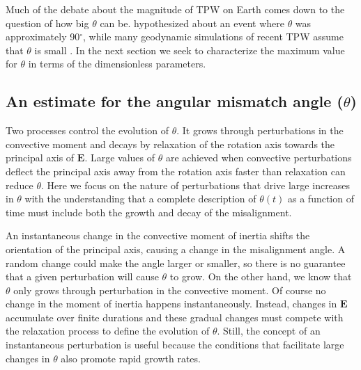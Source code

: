 \documentclass[preprint,12pt,authoryear]{elsarticle}
\begin{document}
 Much of the debate about the magnitude of TPW on Earth comes down to the question of how big $\theta$ can be. \citet{kirschvink1997evidence} hypothesized about an event where $\theta$ was approximately 90$^\circ$, while many geodynamic simulations of recent TPW assume that $\theta$ is small \citep{steinberger1997changes}. In the next section we seek to characterize the maximum value for $\theta$ in terms of the dimensionless parameters.

\subsection{An estimate for the angular mismatch angle ($\theta$)}
\label{sec:theta}

Two processes control the evolution of $\theta$. It grows through perturbations in the convective moment and  decays by relaxation of the rotation axis towards the principal axis of $\mathbf{E}$. Large values of $\theta$ are achieved when
convective perturbations deflect the principal axis away from the rotation axis faster than relaxation can reduce $\theta$. Here we focus on the nature of
perturbations that drive large increases in $\theta$ with the understanding that a complete description of $\theta(t)$ as a function of time must include both the growth and decay of the misalignment. 

An instantaneous change in the convective moment of inertia shifts the orientation of the principal axis, causing a change in the misalignment angle. A random change could make the angle larger or smaller, so there is no guarantee that a given perturbation will cause $\theta$ to grow. On the other hand,  we know that $\theta$ only grows through perturbation in the convective moment. Of course no change in the moment of inertia happens instantaneously. Instead,  changes in $\mathbf{E}$ accumulate over  finite durations and these gradual changes must compete with the relaxation process to define the evolution of $\theta$. Still, the concept of an instantaneous perturbation is useful because the conditions that facilitate large changes in $\theta$ also promote rapid growth rates. 
\end{document}
